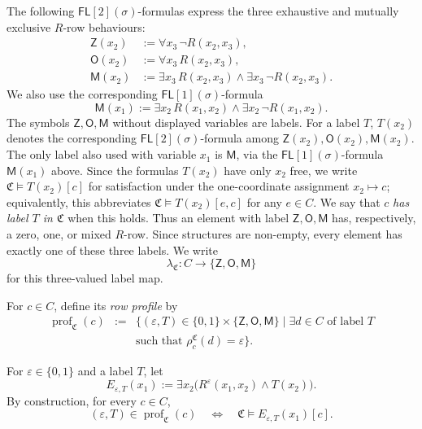 \documentclass{lmcs}
\newcommand{\FL}{\mathsf{FL}}
\newcommand{\C}{\mathfrak{C}}
\newcommand{\Zt}{\mathsf{Z}}
\newcommand{\Ot}{\mathsf{O}}
\newcommand{\Mt}{\mathsf{M}}
\newcommand{\Types}{\{\Zt,\Ot,\Mt\}}
\newcommand{\prof}{\operatorname{prof}}
\begin{document}
The following \(\FL[2](\sigma)\)-formulas express the three exhaustive and mutually exclusive \(R\)-row behaviours:
\begin{align*}
  \Zt(x_2)&:=\forall x_3\,\neg R(x_2,x_3),\\
  \Ot(x_2)&:=\forall x_3\,R(x_2,x_3),\\
  \Mt(x_2)&:=
    \exists x_3\,R(x_2,x_3)
    \wedge
   \exists x_3\,\neg R(x_2,x_3).
\end{align*}
We also use the corresponding \(\FL[1](\sigma)\)-formula
\[
  \Mt(x_1):=\exists x_2\,R(x_1,x_2)
    \wedge
  \exists x_2\,\neg R(x_1,x_2).
\]
The symbols \(\Zt,\Ot,\Mt\) without displayed variables are labels.  For a
label \(T\), \(T(x_2)\) denotes the corresponding
\(\FL[2](\sigma)\)-formula among
\(\Zt(x_2),\Ot(x_2),\Mt(x_2)\).  The only label also used with variable
\(x_1\) is \(\Mt\), via the \(\FL[1](\sigma)\)-formula \(\Mt(x_1)\)
above.  Since the formulas \(T(x_2)\) have only \(x_2\) free, we write
\(\C\models T(x_2)[c]\) for satisfaction under the one-coordinate assignment
\(x_2\mapsto c\); equivalently, this abbreviates
\(\C\models T(x_2)[e,c]\) for any \(e\in C\).  We say that \(c\)
\emph{has label \(T\) in \(\C\)} when this holds.  Thus an element with label
\(\Zt,\Ot,\Mt\) has, respectively, a zero, one, or mixed \(R\)-row.  Since
structures are non-empty, every element has exactly one of these three labels.
We write
\[
  \lambda_{\C}:C\longrightarrow\Types
\]
for this three-valued label map.

For \(c\in C\), define its \emph{row profile} by
\begin{equation}
  \begin{array}{rcl}
  \prof_{\C}(c)
  &:=&\{(\varepsilon,T)\in\{0,1\}\times\Types\mid
  \exists d\in C\text{ of label }T\\
  &&\text{such that }\rho_c^\C(d)=\varepsilon\}.
  \end{array}
  \label{eq:profile}
\end{equation}

For \(\varepsilon\in\{0,1\}\) and a label \(T\), let
\begin{equation}
  E_{\varepsilon,T}(x_1)
  :=
  \exists x_2\bigl(R^\varepsilon(x_1,x_2)\wedge T(x_2)\bigr).
  \label{eq:E}
\end{equation}
By construction, for every \(c\in C\),
\[
  (\varepsilon,T)\in\prof_{\C}(c)
  \quad\Longleftrightarrow\quad
  \C\models E_{\varepsilon,T}(x_1)[c].
\]
\end{document}

